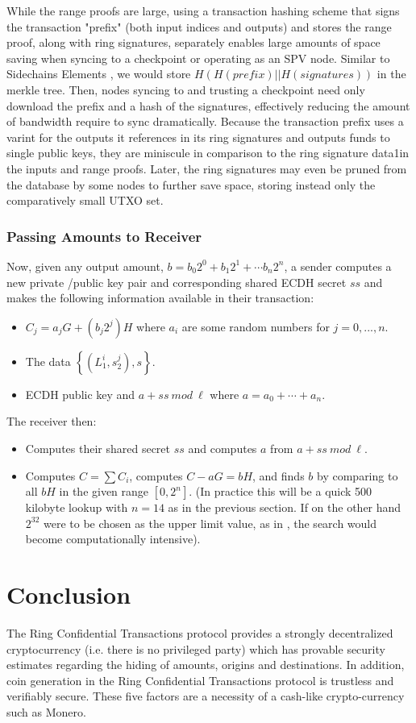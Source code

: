 \documentclass[12pt,english]{mrl}
\theoremstyle{definition}
\numberwithin{equation}{section}
\numberwithin{figure}{section}
\numberwithin{equation}{section}
\numberwithin{equation}{section}
\numberwithin{figure}{section}
\begin{document}
While the range proofs are large, using a transaction hashing scheme that signs the transaction "prefix" (both input indices and outputs) and stores the range proof, along with ring signatures, separately enables large amounts of space saving when syncing to a checkpoint or operating as an SPV node. Similar to Sidechains Elements \cite{El}, we would store 
$H(H(prefix) || H(signatures))$ in the merkle tree. Then, nodes syncing to and trusting a checkpoint need only download the prefix and a hash of the signatures, effectively reducing the amount of bandwidth require to sync dramatically. Because the transaction prefix uses a varint for the outputs it references in its ring signatures and outputs funds to single public keys, they are miniscule in comparison to the ring signature data1in the inputs and range proofs. Later, the ring signatures may even be pruned from the database by some nodes to further save space, storing instead only the comparatively small UTXO set.
\subsubsection{Passing Amounts to Receiver}
Now, given any output amount, $b = b_0 2^0 + b_1 2^1 + \cdots b_n 2^n $, a sender computes a new private /public key pair and corresponding shared ECDH secret $ss$ and makes the following information available in their transaction:
\begin{itemize}
 \item $C_j = a_j G + (b_j 2^j) H$ where $a_i$ are some random numbers for $j=0,...,n$.
 \item The data $\left\{(L_1^i, s_2^j),s\right\}$. 
 \item ECDH public key and $a + ss\ mod\ \ell$ where $a = a_0 + \cdots + a_n$. 
\end{itemize}
The receiver then:
\begin{itemize}
 \item Computes their shared secret $ss$ and computes $a$ from $a + ss\ mod\ \ell$. 
 \item Computes $C = \sum C_i$, computes $C - aG = bH$, and finds $b$ by comparing to all $bH$ in the given range $[0, 2^n]$. (In practice this will be a quick 500 kilobyte lookup with $n = 14$ as in the previous section. If on the other hand $2^{32}$ were to be chosen as the upper limit value, as in \cite{GM}, the search would become computationally intensive). 
\end{itemize}


\section{Conclusion}
The Ring Confidential Transactions protocol provides a strongly decentralized cryptocurrency (i.e. there is no privileged party) which has provable security estimates regarding the hiding of amounts, origins and destinations. In addition, coin generation in the Ring Confidential Transactions protocol is trustless and verifiably secure. These five factors are a necessity of a cash-like crypto-currency such as Monero. 
\end{document}
